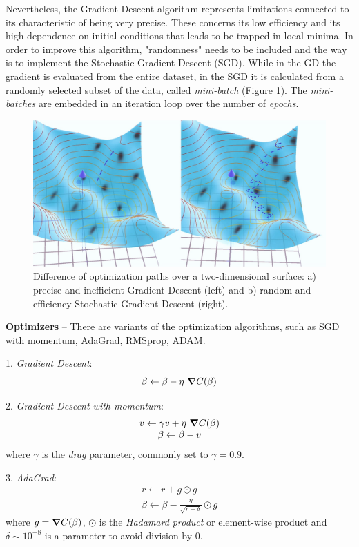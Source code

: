 \documentclass[english,notitlepage,reprint,nofootinbib]{revtex4-1}  %
\begin{document}
Nevertheless, the Gradient Descent algorithm represents limitations connected to its characteristic of being very precise. These concerns its low efficiency and its high dependence on initial conditions that leads to be trapped in local minima. In order to improve this algorithm, "randomness" needs to be included and the way is to implement the Stochastic Gradient Descent (SGD). While in the GD the gradient is evaluated from the entire dataset, in the SGD it is calculated from a randomly selected subset of the data, called \textit{mini-batch} (Figure \ref{fig:gd_sgd}). The \textit{mini-batches} are embedded in an iteration loop over the number of \textit{epochs}.

\begin{figure}[h]
    \centering 
    \includegraphics[scale=0.1]{GD_SGD.jpg}
    \caption{Difference of optimization paths over a two-dimensional surface: a) precise and inefficient Gradient Descent (left) and b) random and efficiency Stochastic Gradient Descent (right).}
    \label{fig:gd_sgd}
\end{figure}

\textbf{Optimizers} – There are variants of the optimization algorithms, such as SGD with momentum, AdaGrad, RMSprop, ADAM.

1. \textit{Gradient Descent}:
$$
\beta \leftarrow \beta -\eta \ \gradient C(\beta)
$$

2. \textit{Gradient Descent with momentum}:
$$
\begin{array}{c}
v \leftarrow \gamma v + \eta \ \gradient C(\beta) \\
\beta \leftarrow \beta - v
\end{array}
$$
where $\gamma$ is the \textit{drag} parameter, commonly set to $\gamma = 0.9$.

3. \textit{AdaGrad}:
$$
\begin{array}{c}
r \leftarrow r + g \odot g \\
\beta \leftarrow \beta -\frac{\eta}{\sqrt{r+\delta}} \odot g
\end{array}
$$
where $g=\gradient C(\beta)$, $\odot$ is the \textit{Hadamard product} or element-wise product and $\delta\sim10^{-8}$ is a parameter to avoid division by $0$.
\end{document}

